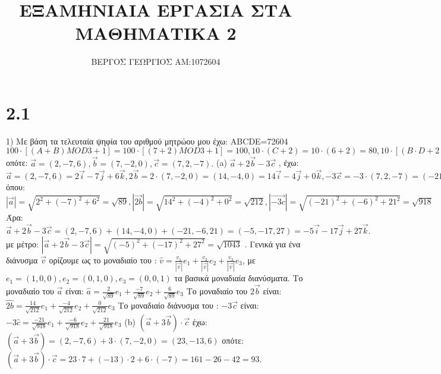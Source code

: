 \documentclass{article}
\title{ΕΞΑΜΗΝΙΑΙΑ ΕΡΓΑΣΙΑ ΣΤΑ ΜΑΘΗΜΑΤΙΚΑ 2 }
\author{ΒΕΡΓΟΣ ΓΕΩΡΓΙΟΣ AM:1072604 }
\begin{document}
\maketitle
\section{2.1}
1)
Με βάση τα τελευταία ψηφία του αριθμού μητρώου μου έχω:
ABCDE=72604 $100\cdot[(A+B)MOD3+1]=100\cdot[(7+2)MOD3 +1]=100 , 10\cdot(C+2)=10\cdot(6+2)=80 ,10\cdot[(B\cdot D + 2)MOD3 + 1]=10\cdot[(0\cdot 2 +2)MOD3 +1]=30$ οπότε: $\vec{a}=(2,-7,6) , \vec{b}=(7,-2,0) , \vec{c}=(7,2,-7).$ \newline
(a)\: $\vec{a} + 2\vec{b} -3\vec{c}$ , έχω:\newline
$\vec{a}=(2,-7,6)= 2\vec{i} - 7\vec{j} + 6\vec{k} , 2\vec{b}=2\cdot(7,-2,0)=(14,-4,0)=14\vec{i} - 4\vec{j} + 0\vec{k} , -3\vec{c}=-3\cdot(7,2,-7)=(-21,-6,21)= -21\vec{i} -  6\vec{j} +21\vec{k}.$ όπου:\newline
$|\vec{a}|=\sqrt{2^2+(-7)^2+6^2}=\sqrt{89} , |\vec{2b}|=\sqrt{14^2+(-4)^2+0^2}=\sqrt{212} , |\vec{-3c}|=\sqrt{(-21)^2+(-6)^2+21^2}=\sqrt{918}$
\newline Άρα: $\vec{a} + 2\vec{b} -3\vec{c}=(2,-7,6) + (14,-4,0) + (-21,-6,21)=(-5,-17,27)= -5\vec{i} - 17\vec{j} + 27\vec{k} . $ με μέτρο: $|\vec{a}+2\vec{b}-3\vec{c}|=\sqrt{(-5)^2+(-17)^2+27^2}=\sqrt{1043}$ . Γενικά για ένα διάνυσμα $\vec{v}$ ορίζουμε ως το μοναδιαίο του : $\hat{v}=\frac{v_1}{|\vec{v}|}e_1 + \frac{v_2}{|\vec{v}|}e_2 + \frac{v_3}{|\vec{v}|}e_3$, με $e_1=(1,0,0) , e_2=(0,1,0) , e_3=(0,0,1)$ τα βασικά μοναδιαία διανύσματα.
\newline
Το μοναδιαίο του $\vec{a}$ είναι:\newline
$\hat{a}=\frac{2}{\sqrt{89}}e_1 +\frac{-7}{\sqrt{89}}e_2 + \frac{6}{\sqrt{89}}e_3$ \newline
Το μοναδιαίο του $2\vec{b}$ είναι:\newline
$\hat{2b}=\frac{14}{\sqrt{212}}e_1 +\frac{-4}{\sqrt{212}}e_2 +\frac{0}{\sqrt{212}}e_3$ \newline
Το μοναδιαίο διάνυσμα του : $-3\vec{c}$ είναι:\newline
$-3\hat{c}=\frac{-21}{\sqrt{918}}e_1 + \frac{-6}{\sqrt{918}}e_2 + \frac{21}{\sqrt{918}}e_3$
\newline
(b) $(\vec{a} + 3\vec{b})\cdot \vec{c}$ έχω:\newline
$(\vec{a} + 3\vec{b})=(2,-7,6) + 3\cdot(7,-2,0)=(23,-13,6)$ οπότε: $(\vec{a} + 3\vec{b})\cdot \vec{c}=23\cdot7 +(-13)\cdot2 + 6\cdot(-7)=161-26-42=93.$ \newline
\end{document}
